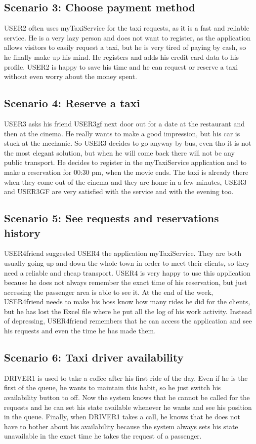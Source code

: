 \documentclass[18pt,oneside,a4paper, titlepage]{article}
\begin{document}
	\subsection{Scenario 3: Choose payment method}
		USER2 often uses myTaxiService for the taxi requests, as it is a fast and reliable service. He is a very lazy person and does not want to register, as the application allows visitors to easily request a taxi, but he is very tired of paying by cash, so he finally make up his mind. He registers and adds his credit card data to his profile. USER2 is happy to save his time and he can request or reserve a taxi without even worry about the money spent.
	
	\subsection{Scenario 4: Reserve a taxi}
		USER3 asks his friend USER3gf next door out for a date at the restaurant and then at the cinema. He really wants to make a good impression, but his car is stuck at the mechanic. So USER3 decides to go anyway by bus, even tho it is not the most elegant solution, but when he will come back there will not be any public transport. He decides to register in the myTaxiService application and to make a reservation for 00:30 pm, when the movie ends. The taxi is already there when they come out of the cinema and they are home in a few minutes, USER3 and USER3GF are very satisfied with the service and with the evening too.
		 
	\subsection{Scenario 5: See requests and reservations history}
		USER4friend suggested USER4 the application myTaxiService. They are both usually going up and down the whole town in order to meet their clients, so they need a reliable and cheap transport. USER4 is very happy to use this application because he does not always remember the exact time of his reservation, but just accessing the passenger area is able to see it. At the end of the week, USER4friend needs to make his boss know how many rides he did for the clients, but he has lost the Excel file where he put all the log of his work activity. Instead of depressing, USER4friend remembers that he can access the application and see his requests and even the time he has made them. 
		
	\subsection{Scenario 6: Taxi driver availability}
		DRIVER1 is used to take a coffee after his first ride of the day. Even if he is the first of the queue, he wants to maintain this habit, so he just switch his availability button to off. Now the system knows that he cannot be called for the requests and he can set his state available whenever he wants and see his position in the queue. Finally, when DRIVER1 takes a call, he knows that he does not have to bother about his availability because the system always sets his state unavailable in the exact time he takes the request of a passenger.
		
\end{document}
